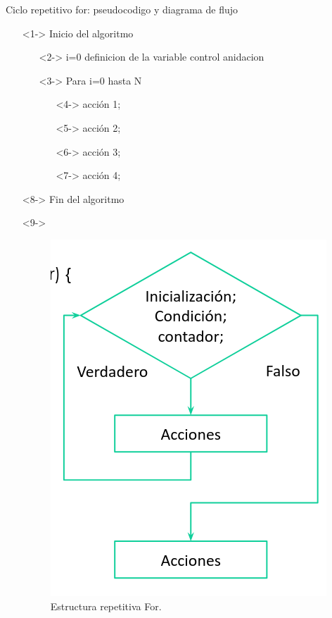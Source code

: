\documentclass[xcolor=pdftex,table,11pt]{beamer}
\begin{document}
\begin{frame}{Ciclo repetitivo for: pseudocodigo y diagrama de flujo }

\begin{itemize}
   \item[]<1-> Inicio del algoritmo

   \begin{itemize}
   		\item[]<2-> i=0 definicion de la variable control
     	anidacion\item[]<3-> Para i=0 hasta N
     	\begin{itemize}
     			\item[]<4->  acción 1;
     			\item[]<5->  acción 2;
     			\item[]<6->  acción 3;
     			\item[]<7->  acción 4;
     	\end{itemize}
   \end{itemize}
  \item[]<8-> Fin del algoritmo
  \item[]<9-> 
   \begin{figure}
 \centering
\includegraphics[scale=0.25]{../img/exported/for.png}
\caption{Estructura repetitiva For.}
\end{figure}
\end{itemize}
\end{frame}
\end{document}
